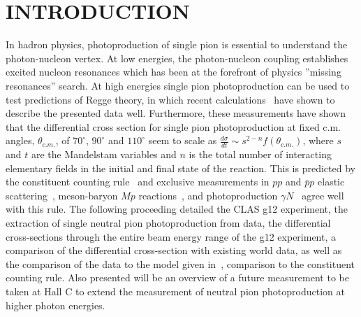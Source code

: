 \documentclass{aip-cp}
\begin{document}
\section{INTRODUCTION}
In hadron physics, photoproduction of single pion is essential to understand the photon-nucleon vertex. At low energies, the photon-nucleon coupling establishes excited nucleon resonances which has been at the forefront of physics ''missing resonances'' search. At high energies single pion photoproduction can be used to test predictions of Regge theory, in which recent calculations~\cite{JPAC} have shown to describe the presented data well. Furthermore, these measurements have shown that the differential cross section for single pion photoproduction at fixed c.m. angles, $\theta_{c.m.}$, of $70^{\circ}$, $90^{\circ}$ and $110^{\circ}$ seem to scale as $\frac{d\sigma}{dt} \sim s^{2-n}f(\theta_{c.m.})$, where $s$ and $t$ are the Mandelstam variables and $n$ is the total number of interacting elementary fields in the initial and final state of the reaction. This is predicted by the constituent counting rule~\cite{scaling1,scaling2} and exclusive measurements in $pp$ and  $\bar{p}p$ elastic scattering~\cite{scalingexp5, scalingexp7}, meson-baryon $M p$ reactions~\cite{scalingexp7}, and photoproduction $\gamma N$~\cite{scalingexp2, scalingexp3, scalingexp4, scalingexp6, scalingexp8, scalingexp9, scalingexp10, scalingexp11} agree well with this rule. The following proceeding detailed the CLAS g12 experiment, the extraction of single neutral pion photoproduction from data, the differential cross-sections through the entire beam energy range of the g12 experiment, a comparison of the differential cross-section with existing world data, as well as the comparison of the data to the model given in~\cite{JPAC}, comparison to the constituent counting rule. Also presented will be an overview of a future measurement to be taken at Hall C to extend the measurement of neutral pion photoproduction at higher photon energies.
\end{document}
